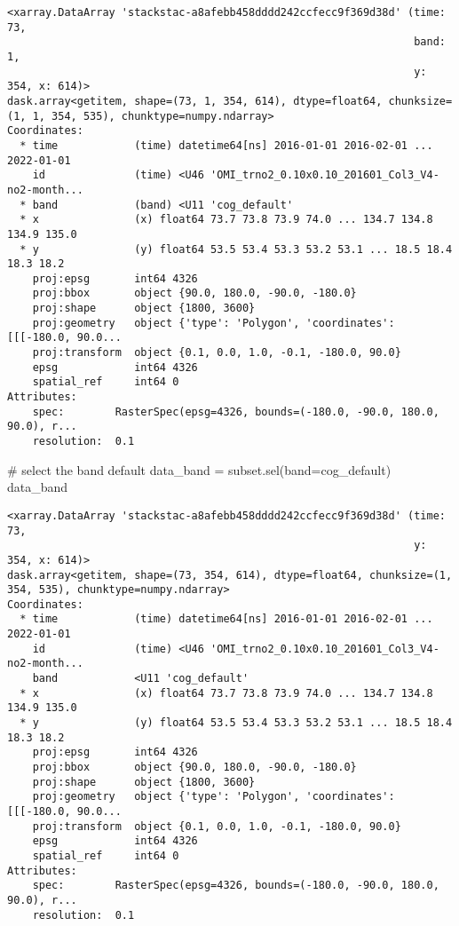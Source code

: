 \documentclass[
  letterpaper,
  DIV=11,
  numbers=noendperiod]{scrreprt}
\newenvironment{Shaded}{\begin{snugshade}}{\end{snugshade}}
\newcommand{\CommentTok}[1]{\textcolor[rgb]{0.37,0.37,0.37}{#1}}
\newcommand{\NormalTok}[1]{\textcolor[rgb]{0.00,0.46,0.62}{#1}}
\newcommand{\OperatorTok}[1]{\textcolor[rgb]{0.37,0.37,0.37}{#1}}
\newcommand{\StringTok}[1]{\textcolor[rgb]{0.13,0.47,0.30}{#1}}
\begin{document}
\begin{verbatim}
<xarray.DataArray 'stackstac-a8afebb458dddd242ccfecc9f369d38d' (time: 73,
                                                                band: 1,
                                                                y: 354, x: 614)>
dask.array<getitem, shape=(73, 1, 354, 614), dtype=float64, chunksize=(1, 1, 354, 535), chunktype=numpy.ndarray>
Coordinates:
  * time            (time) datetime64[ns] 2016-01-01 2016-02-01 ... 2022-01-01
    id              (time) <U46 'OMI_trno2_0.10x0.10_201601_Col3_V4-no2-month...
  * band            (band) <U11 'cog_default'
  * x               (x) float64 73.7 73.8 73.9 74.0 ... 134.7 134.8 134.9 135.0
  * y               (y) float64 53.5 53.4 53.3 53.2 53.1 ... 18.5 18.4 18.3 18.2
    proj:epsg       int64 4326
    proj:bbox       object {90.0, 180.0, -90.0, -180.0}
    proj:shape      object {1800, 3600}
    proj:geometry   object {'type': 'Polygon', 'coordinates': [[[-180.0, 90.0...
    proj:transform  object {0.1, 0.0, 1.0, -0.1, -180.0, 90.0}
    epsg            int64 4326
    spatial_ref     int64 0
Attributes:
    spec:        RasterSpec(epsg=4326, bounds=(-180.0, -90.0, 180.0, 90.0), r...
    resolution:  0.1
\end{verbatim}

\begin{Shaded}
\begin{Highlighting}[]
\CommentTok{\# select the band default}
\NormalTok{data\_band }\OperatorTok{=}\NormalTok{ subset.sel(band}\OperatorTok{=}\StringTok{\textquotesingle{}cog\_default\textquotesingle{}}\NormalTok{)}
\NormalTok{data\_band}
\end{Highlighting}
\end{Shaded}

\begin{verbatim}
<xarray.DataArray 'stackstac-a8afebb458dddd242ccfecc9f369d38d' (time: 73,
                                                                y: 354, x: 614)>
dask.array<getitem, shape=(73, 354, 614), dtype=float64, chunksize=(1, 354, 535), chunktype=numpy.ndarray>
Coordinates:
  * time            (time) datetime64[ns] 2016-01-01 2016-02-01 ... 2022-01-01
    id              (time) <U46 'OMI_trno2_0.10x0.10_201601_Col3_V4-no2-month...
    band            <U11 'cog_default'
  * x               (x) float64 73.7 73.8 73.9 74.0 ... 134.7 134.8 134.9 135.0
  * y               (y) float64 53.5 53.4 53.3 53.2 53.1 ... 18.5 18.4 18.3 18.2
    proj:epsg       int64 4326
    proj:bbox       object {90.0, 180.0, -90.0, -180.0}
    proj:shape      object {1800, 3600}
    proj:geometry   object {'type': 'Polygon', 'coordinates': [[[-180.0, 90.0...
    proj:transform  object {0.1, 0.0, 1.0, -0.1, -180.0, 90.0}
    epsg            int64 4326
    spatial_ref     int64 0
Attributes:
    spec:        RasterSpec(epsg=4326, bounds=(-180.0, -90.0, 180.0, 90.0), r...
    resolution:  0.1
\end{verbatim}
\end{document}
